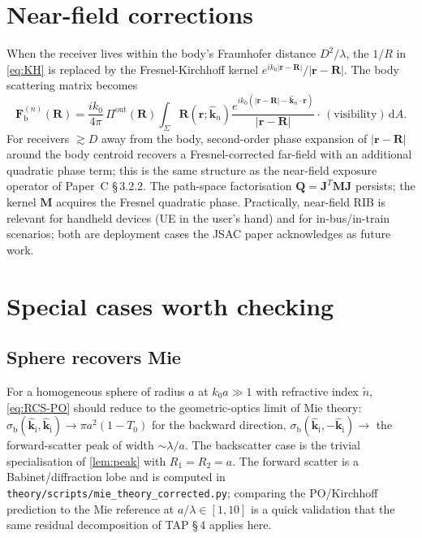 \documentclass[11pt,a4paper]{article}
\theoremstyle{definition}
\newcommand{\khat}{\hat{\bm{k}}}
\newcommand{\rr}{\mathbf{r}}
\newcommand{\diff}{\mathrm{d}}
\newcommand{\kin}{\hat{\bm{k}}_{\mathrm{i}}}
\newcommand{\Frib}{\mathbf{F}_{\mathrm{b}}}
\newcommand{\sigb}{\sigma_{\mathrm{b}}}
\begin{document}
\section{Near-field corrections}\label{sec:nearfield}

When the receiver lives within the body's Fraunhofer distance
$D^2/\lambda$, the $1/R$ in \cref{eq:KH} is replaced by the
Fresnel-Kirchhoff kernel
$e^{ik_0|\rr-\mathbf{R}|}/|\rr-\mathbf{R}|$.  The body scattering
matrix becomes
\begin{equation}\label{eq:Fb-NF}
  \Frib^{(n)}(\mathbf{R})=
  \frac{ik_0}{4\pi}\,\Pi^{\mathrm{out}}(\mathbf{R})\!
  \int_\Sigma\!\!\mathbf{R}(\rr;\khat_n)
  \frac{e^{ik_0(|\rr-\mathbf{R}|-\khat_n\cdot\rr)}}{|\rr-\mathbf{R}|}
  \cdot\,(\text{visibility})\,\diff A.
\end{equation}
For receivers $\gtrsim D$ away from the body, second-order phase
expansion of $|\rr-\mathbf{R}|$ around the body centroid recovers a
Fresnel-corrected far-field with an additional quadratic phase term;
this is the same structure as the near-field exposure operator of
Paper~C \S\,3.2.2.  The path-space factorisation $\mathbf{Q}=
\mathbf{J}^T\mathbf{M}\mathbf{J}$ persists; the kernel $\mathbf{M}$
acquires the Fresnel quadratic phase.  Practically, near-field RIB is
relevant for handheld devices (UE in the user's hand) and for
in-bus/in-train scenarios; both are deployment cases the JSAC paper
acknowledges as future work.

\section{Special cases worth checking}\label{sec:special}

\subsection{Sphere recovers Mie}

For a homogeneous sphere of radius $a$ at $k_0 a\gg 1$ with refractive
index $\tilde n$, \cref{eq:RCS-PO} should reduce to the geometric-optics
limit of Mie theory: $\sigb(\kin,\kin)\to\pi a^2(1-T_0)$ for the
backward direction, $\sigb(\kin,-\kin)\to$ the forward-scatter peak
of width $\sim\lambda/a$.  The backscatter case is the trivial
specialisation of \cref{lem:peak} with $R_1=R_2=a$.  The forward
scatter is a Babinet/diffraction lobe and is computed in
\texttt{theory/scripts/mie\_theory\_corrected.py}; comparing the
PO/Kirchhoff prediction to the Mie reference at $a/\lambda\in[1,10]$
is a quick validation that the same residual decomposition of TAP
\S\,4 applies here.
\end{document}
